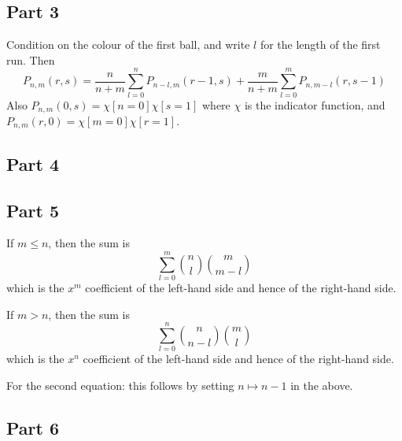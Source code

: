 \documentclass[11pt]{amsart}
\begin{document}
\subsection{Part 3}
Condition on the colour of the first ball, and write $l$ for the length of the first run.
Then
$$P_{n,m}(r,s) = \frac{n}{n+m} \sum_{l=0}^{n} P_{n-l,m}(r-1, s) + \frac{m}{n+m} \sum_{l=0}^m P_{n, m-l}(r, s-1)$$
Also $P_{n,m}(0,s) = \chi[n=0] \chi[s=1]$ where $\chi$ is the indicator function, and $P_{n,m}(r,0) = \chi[m=0] \chi[r=1]$.

\subsection{Part 4}

\subsection{Part 5}
If $m \leq n$, then the sum is $$\sum_{l=0}^m \binom{n}{l} \binom{m}{m-l}$$ which is the $x^m$ coefficient of the left-hand side and hence of the right-hand side.

If $m > n$, then the sum is $$\sum_{l=0}^n \binom{n}{n-l} \binom{m}{l}$$ which is the $x^n$ coefficient of the left-hand side and hence of the right-hand side.

For the second equation: this follows by setting $n \mapsto n-1$ in the above.

\subsection{Part 6}
\end{document}
